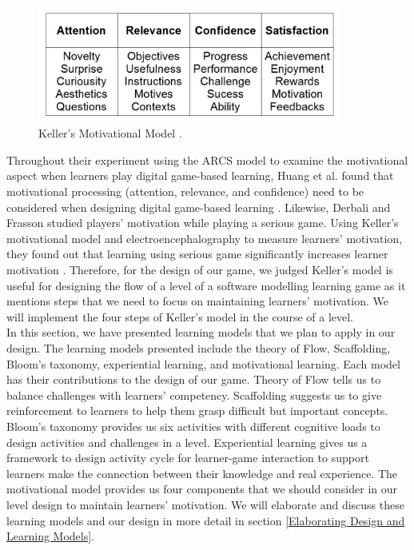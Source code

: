 \documentclass[12pt, a4paper]{report}
\begin{document}
\begin{figure}[ht]
\centering
\includegraphics[width=10cm]{keller}
\caption{Keller's Motivational Model \cite{keller2010motivational}.}
\label{keller}
\end{figure}

Throughout their experiment using the ARCS model to examine the motivational aspect when learners play digital game-based learning, Huang et al. found that motivational processing (attention, relevance, and confidence) need to be considered when designing digital game-based learning \cite{huang2010sustaining}. Likewise, Derbali and Frasson studied players' motivation while playing a serious game. Using Keller's motivational model and electroencephalography to measure learners' motivation, they found out that learning using serious game significantly increases learner motivation \cite{derbali2010players}. Therefore, for the design of our game, we judged Keller's model is useful for designing the flow of a level of a software modelling learning game as it mentions steps that we need to focus on maintaining learners' motivation. We will implement the four steps of Keller's model in the course of a level.\\

In this section, we have presented learning models that we plan to apply in our design. The learning models presented include the theory of Flow, Scaffolding, Bloom's taxonomy, experiential learning, and motivational learning. Each model has their contributions to the design of our game. Theory of Flow tells us to balance challenges with learners' competency. Scaffolding suggests us to give reinforcement to learners to help them grasp difficult but important concepts. Bloom's taxonomy provides us six activities with different cognitive loads to design activities and challenges in a level. Experiential learning gives us a framework to design activity cycle for learner-game interaction to support learners make the connection between their knowledge and real experience. The motivational model provides us four components that we should consider in our level design to maintain learners' motivation. We will elaborate and discuss these learning models and our design in more detail in section \ref{Elaborating Design and Learning Models}. 
\end{document}
